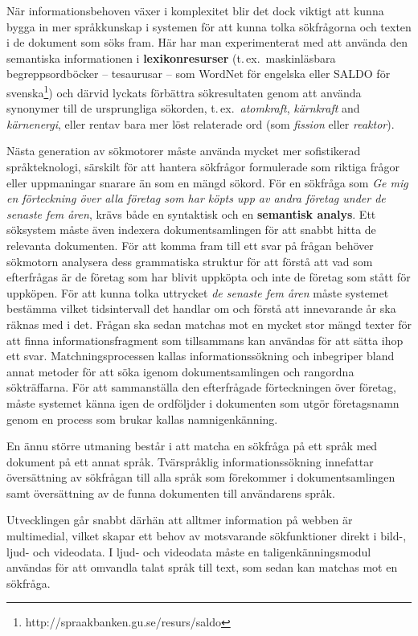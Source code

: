 \begin{multicols}{2}
När informationsbehoven växer i komplexitet blir det dock viktigt att
kunna bygga in mer språkkunskap i systemen för att kunna tolka
sökfrågorna och texten i de dokument som söks fram. Här har man
experimenterat med att använda den semantiska informationen i
\textbf{lexikonresurser} (t.\,ex.~maskinläsbara begreppsordböcker --
tesaurusar -- som WordNet för engelska eller SALDO för
svenska\footnote{http://spraakbanken.gu.se/resurs/saldo}) och därvid
lyckats förbättra sökresultaten genom att använda synonymer till de
ursprungliga sökorden, t.\,ex.~\textit{atomkraft}, \textit{kärnkraft}
and \textit{kärnenergi}, eller rentav bara mer löst relaterade ord
(som \textit{fission} eller \textit{reaktor}).

Nästa generation av sökmotorer måste använda mycket mer sofistikerad
språkteknologi, särskilt för att hantera sökfrågor formulerade som
riktiga frågor eller uppmaningar snarare än som en mängd sökord. För
en sökfråga som \textit{Ge mig en förteckning över alla företag som
  har köpts upp av andra företag under de senaste fem åren}, krävs
både en syntaktisk och en \textbf{semantisk analys}. Ett söksystem 
måste även indexera dokumentsamlingen för att snabbt hitta de
relevanta dokumenten. För att komma fram till ett svar på frågan
behöver sökmotorn analysera dess grammatiska struktur för att förstå
att vad som efterfrågas är de företag som har blivit uppköpta och inte
de företag som stått för uppköpen. För att kunna tolka uttrycket
\textit{de senaste fem åren} måste systemet bestämma vilket
tidsintervall det handlar om och förstå att innevarande år ska räknas
med i det. Frågan ska sedan matchas mot en mycket stor mängd texter
för att finna informationsfragment som tillsammans kan användas för
att sätta ihop ett svar. Matchnings\-pro\-cess\-en kallas
informationssökning och inbegriper bland annat metoder för att söka
igenom dokumentsam\-ling\-en och rangordna sökträffarna. För att
sammanställa den efterfrågade förteckningen över företag, måste
systemet känna igen de ordföljder i dokumenten som utgör företagsnamn
genom en process som brukar kallas namnigenkänning.

En ännu större utmaning består i att matcha en sökfråga på ett språk
med dokument på ett annat språk. Tvärspråklig informationssökning
innefattar översättning av sökfrågan till alla språk som förekommer i
dokumentsamlingen samt översättning av de funna dokumenten till
användarens språk.

Utvecklingen går snabbt därhän att alltmer information på webben är
multimedial, vilket skapar ett behov av motsvarande sökfunktioner
direkt i bild-, ljud- och videodata. I ljud- och videodata måste en
taligenkänningsmodul användas för att omvandla talat språk till text,
som sedan kan matchas mot en sökfråga.


\end{multicols}
